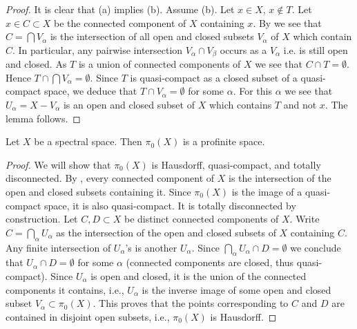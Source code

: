 \begin{proof}
  \leanok
  It is clear that (a) implies (b). Assume (b). Let $x \in X$, $x \notin T$. Let $x \in C \subset X$ be the connected component of $X$ containing $x$. By  we see that $C = \bigcap V_\alpha$ is the intersection of all open and closed subsets $V_\alpha$ of $X$ which contain $C$. In particular, any pairwise intersection $V_\alpha \cap V_\beta$ occurs as a $V_\alpha$ i.e. is still open and closed. As $T$ is a union of connected components of $X$ we see that $C \cap T = \emptyset$. Hence $T \cap \bigcap V_\alpha = \emptyset$. Since $T$ is quasi-compact as a closed subset of a quasi-compact space, we deduce that $T \cap V_\alpha = \emptyset$ for some $\alpha$. For this $\alpha$ we see that $U_\alpha = X - V_\alpha$ is an open and closed subset of $X$ which contains $T$ and not $x$. The lemma follows.
\end{proof}

\begin{lemma}
  \label{thm:pi0-profinite}
  \leanok
  Let $X$ be a spectral space. Then $\pi_0(X)$ is a profinite space.
\end{lemma}

\begin{proof}
  \leanok
  We will show that \(\pi_0(X)\) is Hausdorff, quasi-compact, and totally disconnected.
  By , every connected component of \(X\) is the intersection of the open and closed subsets containing it. Since \(\pi_0(X)\) is the image of a quasi-compact space, it is also quasi-compact. It is totally disconnected by construction. Let \(C,D \subset X\) be distinct connected components of \(X\). Write \(C = \bigcap_{\alpha} U_\alpha\) as the intersection of the open and closed subsets of \(X\) containing \(C\). Any finite intersection of \(U_\alpha\)'s is another \(U_\alpha\). Since \(\bigcap_\alpha U_\alpha \cap D = \emptyset\) we conclude that \(U_\alpha \cap D = \emptyset\) for some \(\alpha\) (connected components are closed, thus quasi-compact). Since \(U_\alpha\) is open and closed, it is the union of the connected components it contains, i.e., \(U_\alpha\) is the inverse image of some open and closed subset \(V_\alpha \subset \pi_0(X)\). This proves that the points corresponding to \(C\) and \(D\) are contained in disjoint open subsets, i.e., \(\pi_0(X)\) is Hausdorff.
\end{proof}

